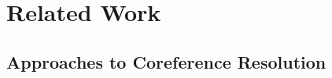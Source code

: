 \documentclass[11pt]{article}
\begin{document}
\section{Related Work}

\subsection{Approaches to Coreference Resolution}




\end{document}
